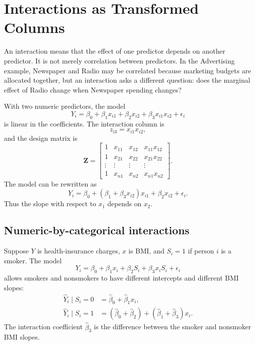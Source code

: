 {\section{Interactions as Transformed Columns}

An interaction means that the effect of one predictor depends on another predictor.  It is not merely correlation between predictors.  In the Advertising example, Newspaper and Radio may be correlated because marketing budgets are allocated together, but an interaction asks a different question: does the marginal effect of Radio change when Newspaper spending changes?

With two numeric predictors, the model
\begin{equation}
  Y_i=\beta_0+\beta_1x_{i1}+\beta_2x_{i2}+\beta_3x_{i1}x_{i2}+\epsilon_i
  \label{eq:ch11-interaction-model}
\end{equation}
is linear in the coefficients.  The interaction column is
\begin{equation}
  z_{i3}=x_{i1}x_{i2},
\end{equation}
and the design matrix is
\begin{equation}
  \mathbf{Z}=\begin{bmatrix}
    1 & x_{11} & x_{12} & x_{11}x_{12} \\
    1 & x_{21} & x_{22} & x_{21}x_{22} \\
    \vdots & \vdots & \vdots & \vdots \\
    1 & x_{n1} & x_{n2} & x_{n1}x_{n2}
  \end{bmatrix}.
\end{equation}
The model can be rewritten as
\begin{equation}
  Y_i=\beta_0+\left(\beta_1+\beta_3x_{i2}\right)x_{i1}+\beta_2x_{i2}+\epsilon_i.
\end{equation}
Thus the slope with respect to \(x_1\) depends on \(x_2\).

\subsection*{Numeric-by-categorical interactions}

Suppose \(Y\) is health-insurance charges, \(x\) is BMI, and \(S_i=1\) if person \(i\) is a smoker.  The model
\begin{equation}
  Y_i=\beta_0+\beta_1x_i+\beta_2S_i+\beta_3x_iS_i+\epsilon_i
\end{equation}
allows smokers and nonsmokers to have different intercepts and different BMI slopes:
\begin{align}
  \widehat{Y}_i\mid S_i=0 &= \widehat{\beta}_0+\widehat{\beta}_1x_i,\\
  \widehat{Y}_i\mid S_i=1 &= (\widehat{\beta}_0+\widehat{\beta}_2)+(\widehat{\beta}_1+\widehat{\beta}_3)x_i.
\end{align}
The interaction coefficient \(\widehat{\beta}_3\) is the difference between the smoker and nonsmoker BMI slopes.

}
